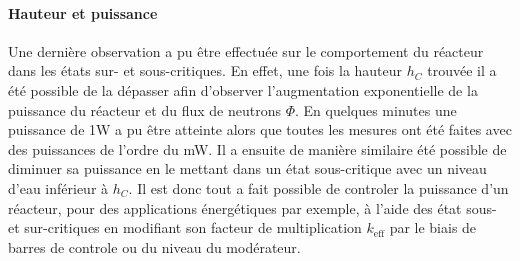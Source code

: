 \paragraph{Hauteur et puissance}
Une dernière observation a pu être effectuée sur le comportement du réacteur dans les états sur- et sous-critiques. En effet, une fois la hauteur $h_C$ trouvée il a été possible de la dépasser afin d'observer l'augmentation exponentielle de la puissance du réacteur et du flux de neutrons $\Phi$. En quelques minutes une puissance de 1W a pu être atteinte alors que toutes les mesures ont été faites avec des puissances de l'ordre du \si{\milli\watt}. Il a ensuite de manière similaire été possible de diminuer sa puissance en le mettant dans un état sous-critique avec un niveau d'eau inférieur à $h_C$. Il est donc tout a fait possible de controler la puissance d'un réacteur, pour des applications énergétiques par exemple, à l'aide des état sous- et sur-critiques en modifiant son facteur de multiplication $k_\mathrm{eff}$ par le biais de barres de controle ou du niveau du modérateur.